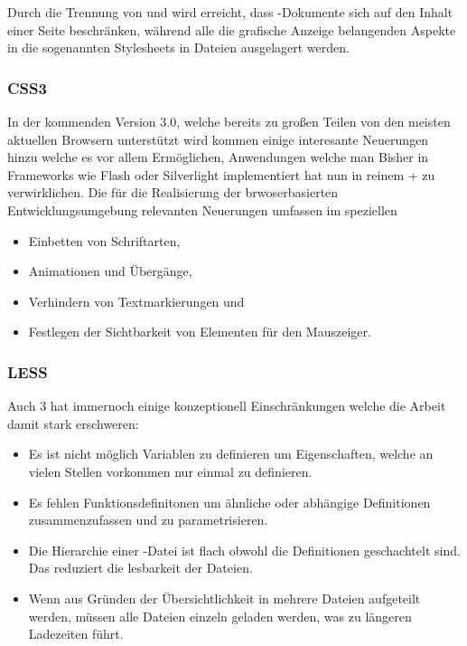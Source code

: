 Durch die Trennung von  und  wird erreicht, dass -Dokumente sich auf
den Inhalt einer Seite beschränken, während alle die grafische Anzeige  belangenden Aspekte in die
sogenannten Stylesheets in  Dateien ausgelagert  werden.

\subsubsection{CSS3}

In der kommenden  Version 3.0, welche bereits zu großen Teilen von den meisten aktuellen
Browsern unterstützt wird kommen einige interesante Neuerungen hinzu welche es vor allem
Ermöglichen, Anwendungen welche man Bisher in Frameworks wie Flash oder Silverlight implementiert
hat nun in reinem + zu verwirklichen. Die für die Realisierung der
brwoserbasierten Entwicklungsumgebung relevanten Neuerungen umfassen im speziellen

\begin{itemize}
  \item Einbetten von Schriftarten,
  \item Animationen und Übergänge,
  \item Verhindern von Textmarkierungen und
  \item Festlegen der Sichtbarkeit von Elementen für den Mauszeiger.
\end{itemize}

\subsubsection{LESS}

\label{sec:less}

Auch 3 hat immernoch einige konzeptionell Einschränkungen welche die Arbeit damit stark
erschweren:

\begin{itemize} 
  \item Es ist nicht möglich Variablen zu definieren um Eigenschaften, welche an
vielen Stellen vorkommen nur einmal zu definieren. 
  \item Es fehlen Funktionsdefinitonen um ähnliche
oder abhängige Definitionen  zusammenzufassen und zu parametrisieren. 
  \item Die Hierarchie einer
-Datei ist flach obwohl die Definitionen geschachtelt sind. Das reduziert die lesbarkeit
der Dateien. 
  \item Wenn aus Gründen der Übersichtlichkeit  in mehrere Dateien aufgeteilt
werden, müssen alle Dateien einzeln geladen werden, was zu längeren Ladezeiten führt. \end{itemize}

